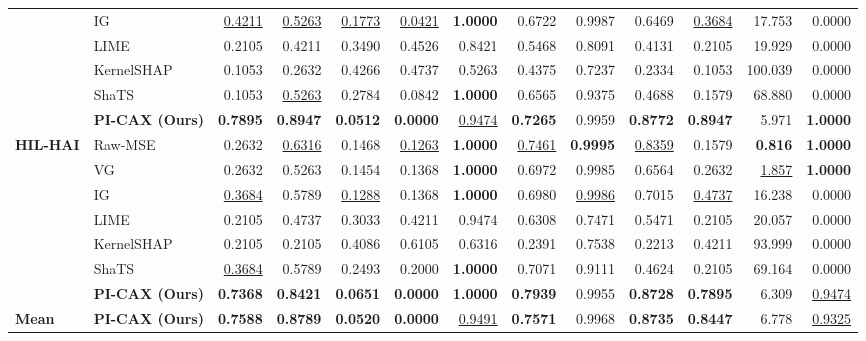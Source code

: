 \documentclass[10pt,a4paper]{article}
\begin{document}
\begin{table}[ht!]
{\begin{tabular}{l l r r r r r r r r r r r}
 & IG \cite{mathuros2024waxai} & \underline{0.4211} & \underline{0.5263} & \underline{0.1773} & \underline{0.0421} & \textbf{1.0000} & 0.6722 & 0.9987 & 0.6469 & \underline{0.3684} & 17.753 & 0.0000 \\
 & LIME \cite{oinonen2026epsr} & 0.2105 & 0.4211 & 0.3490 & 0.4526 & 0.8421 & 0.5468 & 0.8091 & 0.4131 & 0.2105 & 19.929 & 0.0000 \\
 & KernelSHAP \cite{huong2022fedex} & 0.1053 & 0.2632 & 0.4266 & 0.4737 & 0.5263 & 0.4375 & 0.7237 & 0.2334 & 0.1053 & 100.039 & 0.0000 \\
 & ShaTS \cite{franco2026shats} & 0.1053 & \underline{0.5263} & 0.2784 & 0.0842 & \textbf{1.0000} & 0.6565 & 0.9375 & 0.4688 & 0.1579 & 68.880 & 0.0000 \\
 & \textbf{PI-CAX (Ours)} & \textbf{0.7895} & \textbf{0.8947} & \textbf{0.0512} & \textbf{0.0000} & \underline{0.9474} & \textbf{0.7265} & 0.9959 & \textbf{0.8772} & \textbf{0.8947} & 5.971 & \textbf{1.0000} \\
\midrule
\textbf{HIL-HAI} & Raw-MSE \cite{fung2024ndss} & 0.2632 & \underline{0.6316} & 0.1468 & \underline{0.1263} & \textbf{1.0000} & \underline{0.7461} & \textbf{0.9995} & \underline{0.8359} & 0.1579 & \textbf{0.816} & \textbf{1.0000} \\
 & VG \cite{oinonen2026epsr} & 0.2632 & 0.5263 & 0.1454 & 0.1368 & \textbf{1.0000} & 0.6972 & 0.9985 & 0.6564 & 0.2632 & \underline{1.857} & \textbf{1.0000} \\
 & IG \cite{mathuros2024waxai} & \underline{0.3684} & 0.5789 & \underline{0.1288} & 0.1368 & \textbf{1.0000} & 0.6980 & \underline{0.9986} & 0.7015 & \underline{0.4737} & 16.238 & 0.0000 \\
 & LIME \cite{oinonen2026epsr} & 0.2105 & 0.4737 & 0.3033 & 0.4211 & 0.9474 & 0.6308 & 0.7471 & 0.5471 & 0.2105 & 20.057 & 0.0000 \\
 & KernelSHAP \cite{huong2022fedex} & 0.2105 & 0.2105 & 0.4086 & 0.6105 & 0.6316 & 0.2391 & 0.7538 & 0.2213 & 0.4211 & 93.999 & 0.0000 \\
 & ShaTS \cite{franco2026shats} & \underline{0.3684} & 0.5789 & 0.2493 & 0.2000 & \textbf{1.0000} & 0.7071 & 0.9111 & 0.4624 & 0.2105 & 69.164 & 0.0000 \\
 & \textbf{PI-CAX (Ours)} & \textbf{0.7368} & \textbf{0.8421} & \textbf{0.0651} & \textbf{0.0000} & \textbf{1.0000} & \textbf{0.7939} & 0.9955 & \textbf{0.8728} & \textbf{0.7895} & 6.309 & \underline{0.9474} \\
\midrule
\textbf{Mean} & \textbf{PI-CAX (Ours)} & \textbf{0.7588} & \textbf{0.8789} & \textbf{0.0520} & \textbf{0.0000} & \underline{0.9491} & \textbf{0.7571} & 0.9968 & \textbf{0.8735} & \textbf{0.8447} & 6.778 & \underline{0.9325} \\
\bottomrule
\end{tabular}%
}
\end{table}
\end{document}
